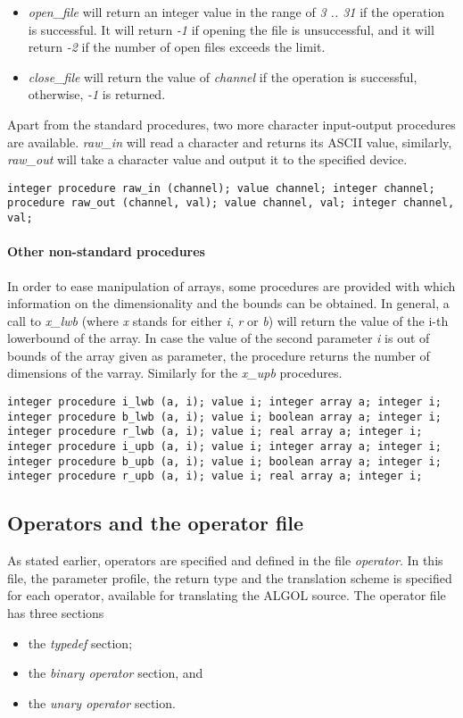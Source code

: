 \documentclass[11pt]{article}
\begin{document}
\begin{itemize}
\item {\em open\_file} will return an integer value in
the range of {\em 3 .. 31} if the operation is successful.
It will return  {\em -1} if opening the file is unsuccessful,
and it will return {\em -2} if the number of open files exceeds the limit.
\item
{\em close\_file} will return the value of {\em channel}
if the operation is successful, otherwise, {\em -1} is returned.
\end{itemize}
Apart from the standard procedures, two more character input-output procedures
are available.
{\em raw\_in} will read a character and returns its ASCII value, similarly,
{\em raw\_out} will take a character value and output it to the specified device.
{\footnotesize
\begin{verbatim}
integer procedure raw_in (channel); value channel; integer channel; 
procedure raw_out (channel, val); value channel, val; integer channel, val; 
\end{verbatim}
}

\paragraph{Other non-standard procedures}
In order to ease manipulation of arrays, some procedures are provided with which information on
the dimensionality and the bounds can be obtained.
In general, a call to {\em x\_lwb} (where {\em x} stands for
either {\em i}, {\em r} or {\em b})
will return the value of the i-th lowerbound of the array. 
In case the value of the second parameter {\em i}
is out of bounds of the array given as parameter,
the procedure returns the number of dimensions of the varray.
Similarly for the {\em x\_upb} procedures.
{\footnotesize
\begin{verbatim}
integer procedure i_lwb (a, i); value i; integer array a; integer i;
integer procedure b_lwb (a, i); value i; boolean array a; integer i; 
integer procedure r_lwb (a, i); value i; real array a; integer i; 
integer procedure i_upb (a, i); value i; integer array a; integer i; 
integer procedure b_upb (a, i); value i; boolean array a; integer i; 
integer procedure r_upb (a, i); value i; real array a; integer i; 
\end{verbatim}
}

\subsection{Operators and the operator file}
As stated earlier, operators are specified and defined
in the file {\em operator}.
In this file, the parameter profile, the return type and the
translation scheme is specified for each operator, available
for translating the ALGOL source.
The operator file has three sections
\begin{itemize}
\item the {\em typedef} section;
\item the {\em binary operator} section, and
\item the {\em unary operator} section.
\end{itemize}
\end{document}
